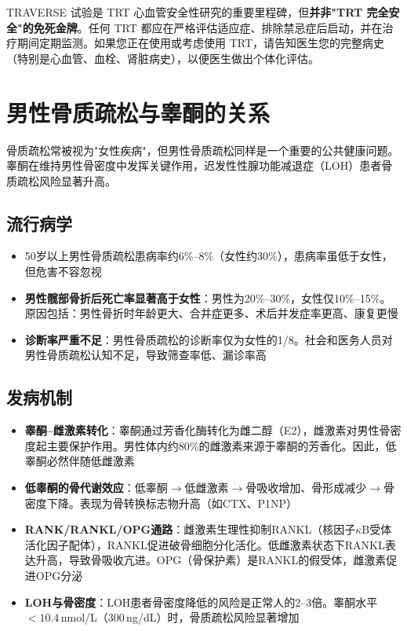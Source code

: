 \begin{enumerate}
\begin{tcolorbox}[colback=pink!5!white,colframe=red!50!black,title=贴心小叮咛]
TRAVERSE 试验是 TRT 心血管安全性研究的重要里程碑，但\textbf{并非"TRT 完全安全"的免死金牌}。任何 TRT 都应在严格评估适应症、排除禁忌症后启动，并在治疗期间定期监测。如果您正在使用或考虑使用 TRT，请告知医生您的完整病史（特别是心血管、血栓、肾脏病史），以便医生做出个体化评估。
\end{tcolorbox}

\section{男性骨质疏松与睾酮的关系}

骨质疏松常被视为"女性疾病"，但男性骨质疏松同样是一个重要的公共健康问题。睾酮在维持男性骨密度中发挥关键作用，迟发性性腺功能减退症（LOH）患者骨质疏松风险显著升高。

\subsection{流行病学}

\begin{itemize}[leftmargin=2cm]
	\item 50岁以上男性骨质疏松患病率约6\%--8\%（女性约30\%），患病率虽低于女性，但危害不容忽视
	\item \textbf{男性髋部骨折后死亡率显著高于女性}：男性为20\%--30\%，女性仅10\%--15\%。原因包括：男性骨折时年龄更大、合并症更多、术后并发症率更高、康复更慢
	\item \textbf{诊断率严重不足}：男性骨质疏松的诊断率仅为女性的1/8。社会和医务人员对男性骨质疏松认知不足，导致筛查率低、漏诊率高
\end{itemize}

\subsection{发病机制}

\begin{itemize}[leftmargin=2cm]
	\item \textbf{睾酮--雌激素转化}：睾酮通过芳香化酶转化为雌二醇（E2），雌激素对男性骨密度起主要保护作用。男性体内约80\%的雌激素来源于睾酮的芳香化。因此，低睾酮必然伴随低雌激素
	\item \textbf{低睾酮的骨代谢效应}：低睾酮$\rightarrow$低雌激素$\rightarrow$骨吸收增加、骨形成减少$\rightarrow$骨密度下降。表现为骨转换标志物升高（如CTX、P1NP）
	\item \textbf{RANK/RANKL/OPG通路}：雌激素生理性抑制RANKL（核因子$\kappa$B受体活化因子配体），RANKL促进破骨细胞分化活化。低雌激素状态下RANKL表达升高，导致骨吸收亢进。OPG（骨保护素）是RANKL的假受体，雌激素促进OPG分泌
	\item \textbf{LOH与骨密度}：LOH患者骨密度降低的风险是正常人的2--3倍。睾酮水平$<10.4\,$nmol/L（300\,ng/dL）时，骨质疏松风险显著增加
\end{itemize}


\end{enumerate}
